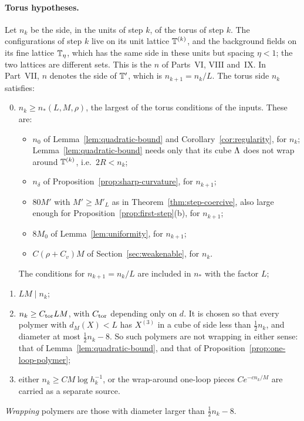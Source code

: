 \paragraph{Torus hypotheses.} Let $n_k$ be the side, in the units of step $k$, of the torus of step $k$. The configurations of step $k$ live on its unit lattice $\mathbb T^{(k)}$, and the background fields on its fine lattice $\mathbb T_\eta$, which has the same side in these units but spacing $\eta<1$; the two lattices are different sets. This is the $n$ of Parts~VI, VIII and~IX. In Part~VII, $n$ denotes the side of $\mathbb T'$, which is $n_{k+1}=n_k/L$. The torus side $n_k$ satisfies:
\begin{enumerate}[label=(T\arabic*)]
\setcounter{enumi}{-1}
\item $n_k\ge n_*(L,M,\rho)$, the largest of the torus conditions of the inputs. These are:
  \begin{itemize}
  \item $n_0$ of Lemma~\ref{lem:quadratic-bound} and Corollary~\ref{cor:regularity}, for $n_k$; Lemma~\ref{lem:quadratic-bound} needs only that its cube $\Lambda$ does not wrap around $\mathbb T^{(k)}$, i.e.\ $2R<n_k$;
  \item $n_\delta$ of Proposition~\ref{prop:sharp-curvature}, for $n_{k+1}$;
  \item $80M'$ with $M'\ge M'_L$ as in Theorem~\ref{thm:step-coercive}, also large enough for Proposition~\ref{prop:first-step}(b), for $n_{k+1}$;
  \item $8M_0$ of Lemma~\ref{lem:uniformity}, for $n_{k+1}$;
  \item $C(\rho+C_v)M$ of Section~\ref{sec:weakenable}, for $n_k$.
  \end{itemize}
  The conditions for $n_{k+1}=n_k/L$ are included in $n_*$ with the factor $L$;
\item $LM\mid n_k$;
\item $n_k\ge C_{\rm tor}LM$, with $C_{\rm tor}$ depending only on $d$. It is chosen so that every polymer with $d_M(X)<L$ has $X^{(3)}$ in a cube of side less than $\frac12n_k$, and diameter at most $\frac12n_k-8$. So such polymers are not wrapping in either sense: that of Lemma~\ref{lem:quadratic-bound}, and that of Proposition~\ref{prop:one-loop-polymer};
\item either $n_k\ge CM\log h_k^{-1}$, or the wrap-around one-loop pieces $Ce^{-cn_k/M}$ are carried as a separate source.
\end{enumerate}
\emph{Wrapping} polymers are those with diameter larger than $\frac12n_k-8$.

